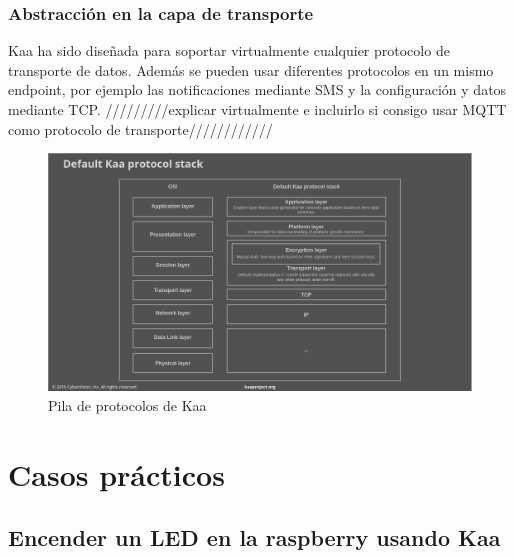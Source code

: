 \documentclass[12pt, twoside]{book}
\begin{document}
\subsubsection*{Abstracción en la capa de transporte}
Kaa ha sido diseñada para soportar virtualmente cualquier protocolo de transporte de datos. Además se pueden usar diferentes protocolos en un mismo endpoint, por ejemplo las notificaciones mediante SMS y la configuración y datos mediante TCP. /////////explicar virtualmente e incluirlo si consigo usar MQTT como protocolo de transporte////////////
\begin{figure}[H]
\centering
\includegraphics[scale=0.4]{images/kaa_stack}
\caption{Pila de protocolos de Kaa}\label{L508}
\end{figure}
\section{Casos prácticos}

\subsection{Encender un LED en la raspberry usando Kaa}
\end{document}
